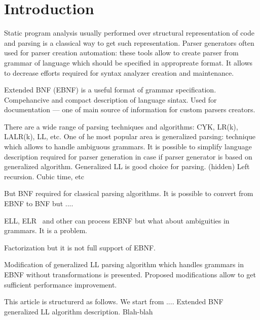 \documentclass[runningheads,a4paper]{llncs}
\begin{document}
\section{Introduction}%

Static program analysis usually performed over structural representation of code and parsing is a classical way to get such representation.
Parser generators often used for parser creation automation: these tools allow to create parser from grammar of language which should be specified in appropreate format.
It allows to decrease efforts required for syntax analyzer creation and maintenance.

Extended BNF (EBNF) is a useful format of grammar specification. 
Compehancive and compact description of language sintax. 
Used for documentation --- one of main source of information for custom parsers creators.

There are a wide range of parsing techniques and algorithms: CYK, LR(k), LALR(k), LL, etc. 
One of he most popular area is generalized parsing: technique which allows to handle ambiguous grammars. 
It is possible to simplify language description required for parser generation in case if parser generator is based on generalized algorithm.
Generalized LL is good choice for parsing.
(hidden) Left  recursion.
Cubic time, etc

But BNF required for classical parsing algorithms.
It is possible to convert from EBNF to BNF but ....

ELL, ELR~\cite{AttributedELL,ELRR,ECFGparsing,ELLParser,ELL,ECFG,ELALR,ELRParsing} and other can process EBNF but what about ambiguities in grammars. It is a problem.

Factorization but it is not full support of EBNF.

Modification of generalized LL parsing algorithm which handles grammars in EBNF without transformations is presented. 
Proposed modifications allow to get sufficient performance improvement.

This article is structurerd as follows.
We start from .... Extended BNF
generalized LL algorithm description.
Blah-blah


\end{document}
